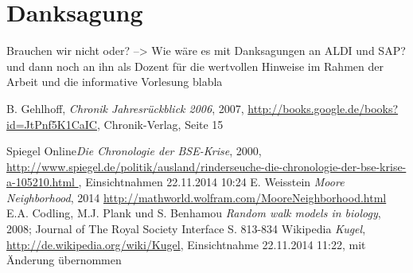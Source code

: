 \documentclass[10pt,twocolumn]{scrartcl}
\begin{document}

\section*{Danksagung}
Brauchen wir nicht oder?
--> Wie wäre es mit Danksagungen an ALDI und SAP? und dann noch an ihn als Dozent für die wertvollen Hinweise im Rahmen der Arbeit und die informative Vorlesung blabla
%
%

\begin{thebibliography}{99}
	B. Gehlhoff,  \textit{Chronik Jahresrückblick 2006}, 2007,
	\url{http://books.google.de/books?id=JtPnf5K1CaIC},
	Chronik-Verlag, Seite 15
	
	
Spiegel Online{\it Die Chronologie der BSE-Krise}, 2000, \url{
	http://www.spiegel.de/politik/ausland/rinderseuche-die-chronologie-der-bse-krise-a-105210.html
	}, Einsichtnahmen 22.11.2014 10:24
E. Weisstein {\it Moore Neighborhood}, 2014 \url{http://mathworld.wolfram.com/MooreNeighborhood.html}
E.A. Codling, M.J. Plank und S. Benhamou {\it Random walk models in biology}, 2008; Journal of The Royal Society Interface S. 813-834
Wikipedia {\it Kugel}, \url{http://de.wikipedia.org/wiki/Kugel}, Einsichtnahme 22.11.2014 11:22, mit Änderung übernommen


\end{thebibliography}
\end{document}
